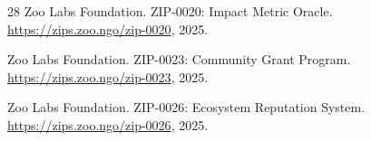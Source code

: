 \documentclass[11pt,letterpaper]{article}
\begin{document}
\begin{thebibliography}{28}
Zoo Labs Foundation.
\newblock ZIP-0020: Impact Metric Oracle.
\newblock \url{https://zips.zoo.ngo/zip-0020}, 2025.

Zoo Labs Foundation.
\newblock ZIP-0023: Community Grant Program.
\newblock \url{https://zips.zoo.ngo/zip-0023}, 2025.

Zoo Labs Foundation.
\newblock ZIP-0026: Ecosystem Reputation System.
\newblock \url{https://zips.zoo.ngo/zip-0026}, 2025.

\end{thebibliography}
\end{document}
